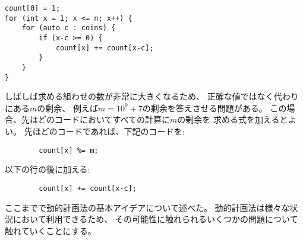 \begin{lstlisting}
count[0] = 1;
for (int x = 1; x <= n; x++) {
    for (auto c : coins) {
        if (x-c >= 0) {
            count[x] += count[x-c];
        }
    }
}
\end{lstlisting}

\begin{comment}
Often the number of solutions is so large
that it is not required to calculate the exact number
but it is enough to give the answer modulo $m$
where, for example, $m=10^9+7$.
This can be done by changing the code so that
all calculations are done modulo $m$.
In the above code, it suffices to add the line
\begin{lstlisting}
        count[x] %= m;
\end{lstlisting}
after the line
\begin{lstlisting}
        count[x] += count[x-c];
\end{lstlisting}

Now we have discussed all basic
ideas of dynamic programming.
Since dynamic programming can be used
in many different situations,
we will now go through a set of problems
that show further examples about the
possibilities of dynamic programming.
\end{comment}

しばしば求める組わせの数が非常に大きくなるため、
正確な値ではなく代わりにある$m$の剰余、
例えば$m=10^9+7$の剰余を答えさせる問題がある。
この場合、先ほどのコードにおいてすべての計算に$m$の剰余を
求める式を加えるとよい。
先ほどのコードであれば、下記のコードを:
\begin{lstlisting}
        count[x] %= m;
\end{lstlisting}
以下の行の後に加える:
\begin{lstlisting}
        count[x] += count[x-c];
\end{lstlisting}

ここまでで動的計画法の基本アイデアについて述べた。
動的計画法は様々な状況において利用できるため、
その可能性に触れられるいくつかの問題について触れていくことにする。

\begin{comment}
\section{Longest increasing subsequence}

\index{longest increasing subsequence}

Our first problem is to find the
\key{longest increasing subsequence}
in an array of $n$ elements.
This is a maximum-length
sequence of array elements
that goes from left to right,
and each element in the sequence is larger
than the previous element.
For example, in the array
\end{comment}

